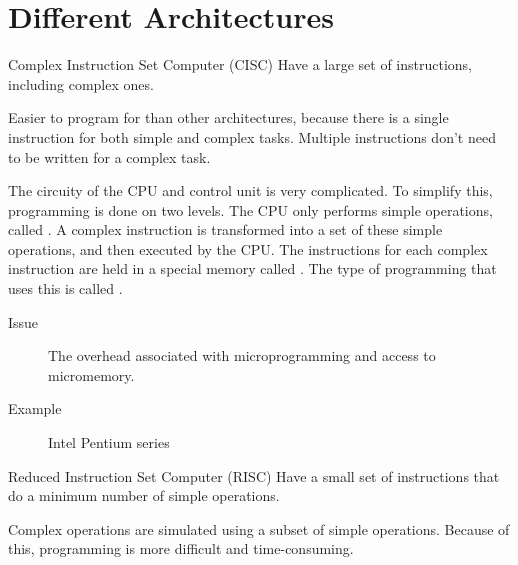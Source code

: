 \documentclass[\main/notes.tex]{subfiles}
\begin{document}
			\section{Different Architectures}
				\begin{definition}{Complex Instruction Set Computer (CISC)}
					Have a large set of instructions, including complex ones.

					Easier to program for than other architectures, because there is a single instruction for both simple and complex tasks. Multiple instructions don't need to be written for a complex task.

					The circuity of the CPU and control unit is very complicated. To simplify this, programming is done on two levels. The CPU only performs simple operations, called . A complex instruction is transformed into a set of these simple operations, and then executed by the CPU. The instructions for each complex instruction are held in a special memory called . The type of programming that uses this is called .

					\begin{description}
						\item[Issue] The overhead associated with microprogramming and access to micromemory.
						\item[Example] Intel Pentium series
					\end{description}
				\end{definition}
				\begin{definition}{Reduced Instruction Set Computer (RISC)}
					Have a small set of instructions that do a minimum number of simple operations.

					Complex operations are simulated using a subset of simple operations. Because of this, programming is more difficult and time-consuming.
				\end{definition}

\end{document}
